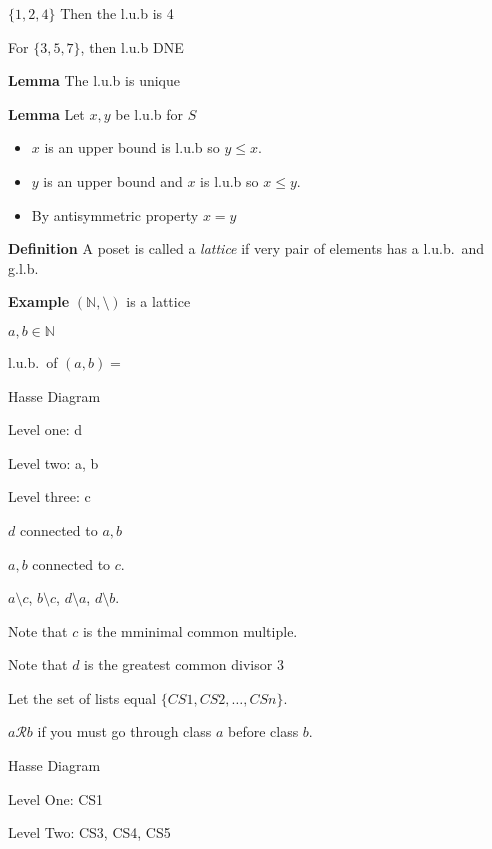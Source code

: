 \documentclass{article}
\begin{document}
    $\{1, 2, 4\}$ Then the l.u.b is 4
    
    For $\{3, 5, 7\}$, then l.u.b DNE
    
    \vspace{1.5mm}
    \textbf{Lemma} The l.u.b is unique
    
    \vspace{1.5mm}
    \textbf{Lemma} Let $x, y$ be l.u.b for $S$
    \begin{itemize}
        \item $x$ is an upper bound is l.u.b so $y \le x$.
        \item $y$ is an upper bound and $x$ is l.u.b so $x \le y$.
        \item By antisymmetric property $x = y$
    \end{itemize}
    
    \vspace{1.5mm}
    \textbf{Definition} A poset is called a \textit{lattice} if very pair of elements has a l.u.b.\ and g.l.b.
    
    \vspace{1.5mm}
    \textbf{Example} $(\mathbb{N}, \setminus)$ is a lattice
    
    $a, b \in \mathbb{N}$
    
    l.u.b.\ of $(a, b)  = $
    
    Hasse Diagram
    
    Level one: d
    
    Level two: a, b
    
    Level three: c
    
    $d$ connected to $a, b$
    
    $a, b$ connected to $c$.
    
    $a \setminus c$, $b \setminus c$, $d \setminus a$, $d \setminus b$.
    
    Note that $c$ is the mminimal common multiple.
    
    Note that $d$ is the greatest common divisor
    3
    
    \vspace{1.5mm}
    
    Let the set of lists equal $\{CS1, CS2, \dots, CSn\}$.
    
    $a \mathcal{R} b$ if you must go through class $a$ before class $b$.
    
    Hasse Diagram
    
    Level One: CS1
    
    Level Two: CS3, CS4, CS5
    
\end{document}

